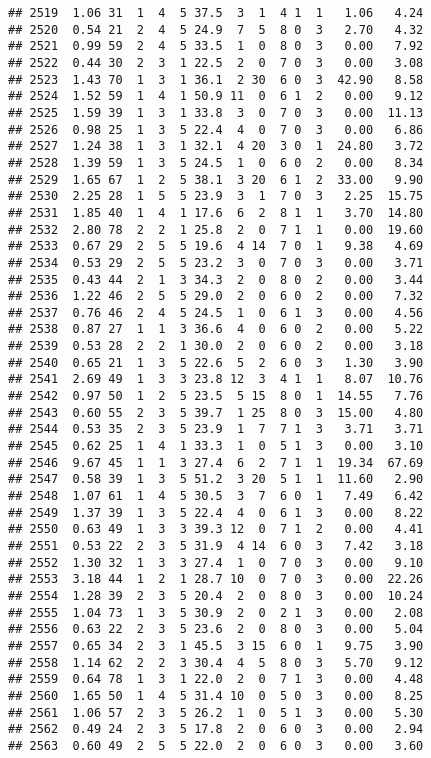 \documentclass[
]{article}
\begin{document}
\begin{verbatim}
## 2519  1.06 31  1  4  5 37.5  3  1  4 1  1   1.06   4.24
## 2520  0.54 21  2  4  5 24.9  7  5  8 0  3   2.70   4.32
## 2521  0.99 59  2  4  5 33.5  1  0  8 0  3   0.00   7.92
## 2522  0.44 30  2  3  1 22.5  2  0  7 0  3   0.00   3.08
## 2523  1.43 70  1  3  1 36.1  2 30  6 0  3  42.90   8.58
## 2524  1.52 59  1  4  1 50.9 11  0  6 1  2   0.00   9.12
## 2525  1.59 39  1  3  1 33.8  3  0  7 0  3   0.00  11.13
## 2526  0.98 25  1  3  5 22.4  4  0  7 0  3   0.00   6.86
## 2527  1.24 38  1  3  1 32.1  4 20  3 0  1  24.80   3.72
## 2528  1.39 59  1  3  5 24.5  1  0  6 0  2   0.00   8.34
## 2529  1.65 67  1  2  5 38.1  3 20  6 1  2  33.00   9.90
## 2530  2.25 28  1  5  5 23.9  3  1  7 0  3   2.25  15.75
## 2531  1.85 40  1  4  1 17.6  6  2  8 1  1   3.70  14.80
## 2532  2.80 78  2  2  1 25.8  2  0  7 1  1   0.00  19.60
## 2533  0.67 29  2  5  5 19.6  4 14  7 0  1   9.38   4.69
## 2534  0.53 29  2  5  5 23.2  3  0  7 0  3   0.00   3.71
## 2535  0.43 44  2  1  3 34.3  2  0  8 0  2   0.00   3.44
## 2536  1.22 46  2  5  5 29.0  2  0  6 0  2   0.00   7.32
## 2537  0.76 46  2  4  5 24.5  1  0  6 1  3   0.00   4.56
## 2538  0.87 27  1  1  3 36.6  4  0  6 0  2   0.00   5.22
## 2539  0.53 28  2  2  1 30.0  2  0  6 0  2   0.00   3.18
## 2540  0.65 21  1  3  5 22.6  5  2  6 0  3   1.30   3.90
## 2541  2.69 49  1  3  3 23.8 12  3  4 1  1   8.07  10.76
## 2542  0.97 50  1  2  5 23.5  5 15  8 0  1  14.55   7.76
## 2543  0.60 55  2  3  5 39.7  1 25  8 0  3  15.00   4.80
## 2544  0.53 35  2  3  5 23.9  1  7  7 1  3   3.71   3.71
## 2545  0.62 25  1  4  1 33.3  1  0  5 1  3   0.00   3.10
## 2546  9.67 45  1  1  3 27.4  6  2  7 1  1  19.34  67.69
## 2547  0.58 39  1  3  5 51.2  3 20  5 1  1  11.60   2.90
## 2548  1.07 61  1  4  5 30.5  3  7  6 0  1   7.49   6.42
## 2549  1.37 39  1  3  5 22.4  4  0  6 1  3   0.00   8.22
## 2550  0.63 49  1  3  3 39.3 12  0  7 1  2   0.00   4.41
## 2551  0.53 22  2  3  5 31.9  4 14  6 0  3   7.42   3.18
## 2552  1.30 32  1  3  3 27.4  1  0  7 0  3   0.00   9.10
## 2553  3.18 44  1  2  1 28.7 10  0  7 0  3   0.00  22.26
## 2554  1.28 39  2  3  5 20.4  2  0  8 0  3   0.00  10.24
## 2555  1.04 73  1  3  5 30.9  2  0  2 1  3   0.00   2.08
## 2556  0.63 22  2  3  5 23.6  2  0  8 0  3   0.00   5.04
## 2557  0.65 34  2  3  1 45.5  3 15  6 0  1   9.75   3.90
## 2558  1.14 62  2  2  3 30.4  4  5  8 0  3   5.70   9.12
## 2559  0.64 78  1  3  1 22.0  2  0  7 1  3   0.00   4.48
## 2560  1.65 50  1  4  5 31.4 10  0  5 0  3   0.00   8.25
## 2561  1.06 57  2  3  5 26.2  1  0  5 1  3   0.00   5.30
## 2562  0.49 24  2  3  5 17.8  2  0  6 0  3   0.00   2.94
## 2563  0.60 49  2  5  5 22.0  2  0  6 0  3   0.00   3.60

\end{verbatim}
\end{document}
